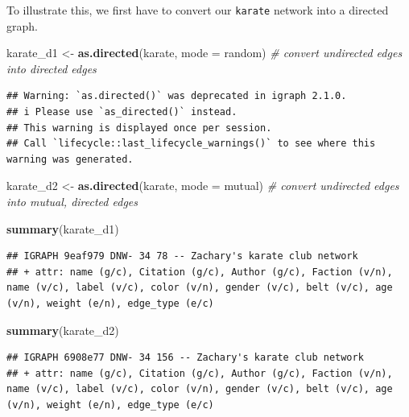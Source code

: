 \documentclass[
]{book}
\newenvironment{Shaded}{\begin{snugshade}}{\end{snugshade}}
\newcommand{\AttributeTok}[1]{\textcolor[rgb]{0.13,0.29,0.53}{#1}}
\newcommand{\CommentTok}[1]{\textcolor[rgb]{0.56,0.35,0.01}{\textit{#1}}}
\newcommand{\FunctionTok}[1]{\textcolor[rgb]{0.13,0.29,0.53}{\textbf{#1}}}
\newcommand{\NormalTok}[1]{#1}
\newcommand{\OtherTok}[1]{\textcolor[rgb]{0.56,0.35,0.01}{#1}}
\newcommand{\StringTok}[1]{\textcolor[rgb]{0.31,0.60,0.02}{#1}}
\begin{document}
To illustrate this, we first have to convert our \texttt{karate} network into a directed graph.

\begin{Shaded}
\begin{Highlighting}[]
\NormalTok{karate\_d1 }\OtherTok{\textless{}{-}} \FunctionTok{as.directed}\NormalTok{(karate, }\AttributeTok{mode =} \StringTok{\textquotesingle{}random\textquotesingle{}}\NormalTok{) }\CommentTok{\# convert undirected edges into directed edges }
\end{Highlighting}
\end{Shaded}

\begin{verbatim}
## Warning: `as.directed()` was deprecated in igraph 2.1.0.
## i Please use `as_directed()` instead.
## This warning is displayed once per session.
## Call `lifecycle::last_lifecycle_warnings()` to see where this warning was generated.
\end{verbatim}

\begin{Shaded}
\begin{Highlighting}[]
\NormalTok{karate\_d2 }\OtherTok{\textless{}{-}} \FunctionTok{as.directed}\NormalTok{(karate, }\AttributeTok{mode =} \StringTok{\textquotesingle{}mutual\textquotesingle{}}\NormalTok{) }\CommentTok{\# convert undirected edges into mutual, directed edges}

\FunctionTok{summary}\NormalTok{(karate\_d1)}
\end{Highlighting}
\end{Shaded}

\begin{verbatim}
## IGRAPH 9eaf979 DNW- 34 78 -- Zachary's karate club network
## + attr: name (g/c), Citation (g/c), Author (g/c), Faction (v/n), name (v/c), label (v/c), color (v/n), gender (v/c), belt (v/c), age (v/n), weight (e/n), edge_type (e/c)
\end{verbatim}

\begin{Shaded}
\begin{Highlighting}[]
\FunctionTok{summary}\NormalTok{(karate\_d2)}
\end{Highlighting}
\end{Shaded}

\begin{verbatim}
## IGRAPH 6908e77 DNW- 34 156 -- Zachary's karate club network
## + attr: name (g/c), Citation (g/c), Author (g/c), Faction (v/n), name (v/c), label (v/c), color (v/n), gender (v/c), belt (v/c), age (v/n), weight (e/n), edge_type (e/c)
\end{verbatim}
\end{document}
